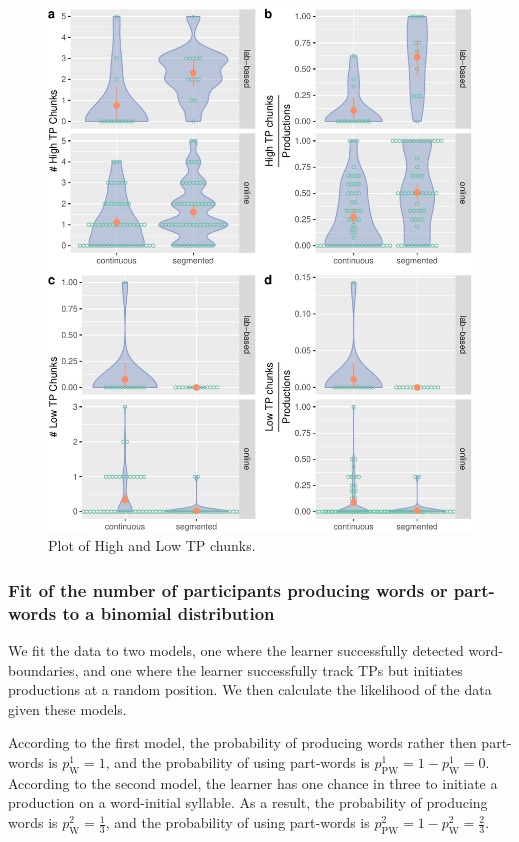 \documentclass[
]{article}
\begin{document}
\begin{figure}

{\centering \includegraphics[width=0.8\linewidth]{segmentation_recall_combined_for_revision4_files/figure-latex/recall-tp-chunks-raw-plot-1} 

}

\caption{Plot of High and Low TP chunks.}\label{fig:recall-tp-chunks-raw-plot}
\end{figure}

\clearpage

\subsubsection{Fit of the number of participants producing words or
part-words to a binomial
distribution}\label{fit-of-the-number-of-participants-producing-words-or-part-words-to-a-binomial-distribution}

We fit the data to two models, one where the learner successfully
detected word-boundaries, and one where the learner successfully track
TPs but initiates productions at a random position. We then calculate
the likelihood of the data given these models.

According to the first model, the probability of producing words rather
then part-words is \(p^1_{\text{W}} = 1\), and the probability of using
part-words is \(p^1_{\text{PW}} = 1 - p^1_{\text{W}} = 0\). According to
the second model, the learner has one chance in three to initiate a
production on a word-initial syllable. As a result, the probability of
producing words is \(p^2_{\text{W}} = \frac{1}{3}\), and the probability
of using part-words is
\(p^2_{\text{PW}} = 1 - p^2_{\text{W}} = \frac{2}{3}\).
\end{document}
